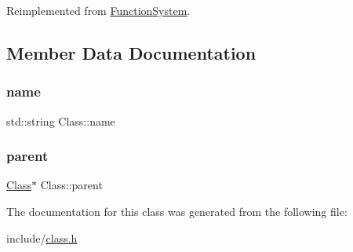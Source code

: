 Reimplemented from \hyperlink{classFunctionSystem_a7356903aa11df3b4c52f7d0c8f230d87}{Function\+System}.



\subsection{Member Data Documentation}
\mbox{\label{classClass_aac209ee2e03afc3bc9e93fd1fd46256b}} 
\subsubsection{\texorpdfstring{name}{name}}
{\footnotesize\ttfamily std\+::string Class\+::name}

\mbox{\label{classClass_a1f94bc39c04d18b5c4421862f8506d1d}} 
\subsubsection{\texorpdfstring{parent}{parent}}
{\footnotesize\ttfamily \hyperlink{classClass}{Class}$\ast$ Class\+::parent}



The documentation for this class was generated from the following file\+:\begin{DoxyCompactItemize}
\item 
include/\hyperlink{class_8h}{class.\+h}\end{DoxyCompactItemize}
